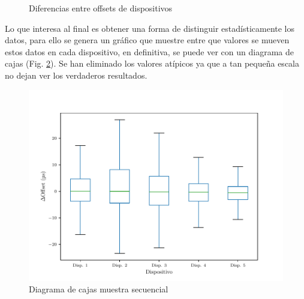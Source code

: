 \begin{figure}
    \centering
    \quad
    \caption{Diferencias entre offsets de dispositivos}
    \label{fig:off_acu_secuencial_diffs}
\end{figure}

Lo que interesa al final es obtener una forma de distinguir estadísticamente los datos, para ello se genera un gráfico que muestre entre que valores se mueven estos datos en cada dispositivo, en definitiva, se puede ver con un diagrama de cajas (Fig. \ref{fig:box_secuencial}). Se han eliminado los valores atípicos ya que a tan pequeña escala no dejan ver los verdaderos resultados.

\begin{figure}
    \centering
    \includegraphics[scale=0.7]{../Python/plots/individual/boxplot_no_out}
    \caption{Diagrama de cajas muestra secuencial}
    \label{fig:box_secuencial}
\end{figure}

